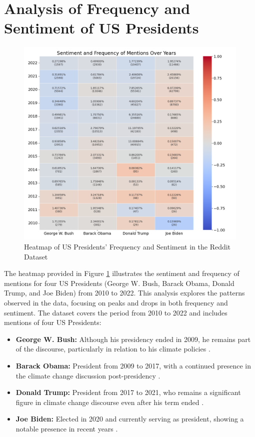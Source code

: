 \section{Analysis of Frequency and Sentiment of US Presidents}
\begin{figure}[h]
    \includegraphics[width=\textwidth]{images/topic_details/entities/heatmap_sentiment_and_frequency_4entities_PERSON.png}
    \caption{Heatmap of US Presidents' Frequency and Sentiment in the Reddit Dataset}
    \label{fig:president_entities}
\end{figure}

The heatmap provided in Figure \ref{fig:president_entities} illustrates the sentiment and frequency of mentions for four US Presidents (George W. Bush, Barack Obama, Donald Trump, and Joe Biden) from 2010 to 2022. This analysis explores the patterns observed in the data, focusing on peaks and drops in both frequency and sentiment.
The dataset covers the period from 2010 to 2022 and includes mentions of four US Presidents:

\begin{itemize}
    \item \textbf{George W. Bush:} Although his presidency ended in 2009, he remains part of the discourse, particularly in relation to his climate policies \cite{Meyer2023}.
    \item \textbf{Barack Obama:} President from 2009 to 2017, with a continued presence in the climate change discussion post-presidency \cite{obamaclimatechangerecord}.
    \item \textbf{Donald Trump:} President from 2017 to 2021, who remains a significant figure in climate change discourse even after his term ended \cite{bbc2020trump}.
    \item \textbf{Joe Biden:} Elected in 2020 and currently serving as president, showing a notable presence in recent years \cite{wri2022biden}.
\end{itemize}

